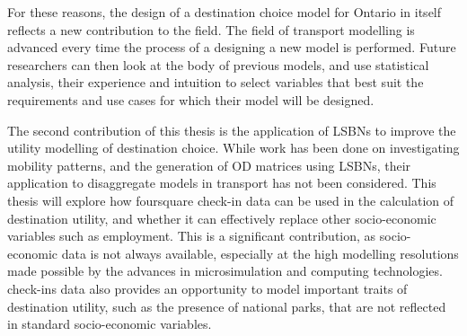For these reasons, the design of a destination choice model for Ontario in itself reflects a new contribution to the field.  The field of transport modelling is advanced every time the process of a designing a new model is performed. Future researchers can then look at the body of previous models, and use statistical analysis, their experience and intuition to select variables that best suit the requirements and use cases for which their model will be designed. 

The second contribution of this thesis is the application of LSBNs to improve the utility modelling of destination choice. While work has been done on investigating mobility patterns, and the generation of OD matrices using LSBNs, their application to disaggregate models in transport has not been considered. This thesis will explore how foursquare check-in data can be used in the calculation of destination utility, and whether it can effectively replace other socio-economic variables such as employment. This is a significant contribution, as socio-economic data is not always available, especially at the high modelling resolutions made possible by the advances in microsimulation and computing technologies. check-ins data also provides an opportunity to model important traits of destination utility, such as the presence of national parks, that are not reflected in standard socio-economic variables.

